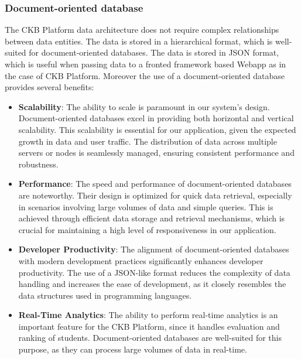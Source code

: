 \subsubsection{Document-oriented database}
The CKB Platform data architecture does not require complex relationships between data entities. The data is stored in a hierarchical format, which is well-suited for document-oriented databases. The data is stored in JSON format, which is useful when passing data to a fronted framework based Webapp as in the case of CKB Platform. Moreover the use of a document-oriented database provides several benefits:
\begin{itemize}
\item \textbf{Scalability}: The ability to scale is paramount in our system's design. Document-oriented databases excel in providing both horizontal and vertical scalability. This scalability is essential for our application, given the expected growth in data and user traffic. The distribution of data across multiple servers or nodes is seamlessly managed, ensuring consistent performance and robustness.
\item \textbf{Performance}: The speed and performance of document-oriented databases are noteworthy. Their design is optimized for quick data retrieval, especially in scenarios involving large volumes of data and simple queries. This is achieved through efficient data storage and retrieval mechanisms, which is crucial for maintaining a high level of responsiveness in our application.
\item \textbf{Developer Productivity}: The alignment of document-oriented databases with modern development practices significantly enhances developer productivity. The use of a JSON-like format reduces the complexity of data handling and increases the ease of development, as it closely resembles the data structures used in programming languages.
\item \textbf{Real-Time Analytics}: The ability to perform real-time analytics is an important feature for the CKB Platform, since it handles evaluation and ranking of students. Document-oriented databases are well-suited for this purpose, as they can process large volumes of data in real-time.
\end{itemize}

